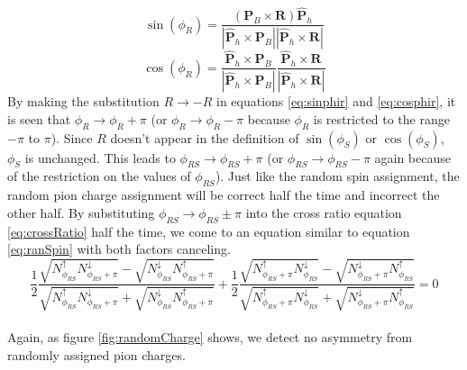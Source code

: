 \documentclass[abstract = on,listof=totoc, bibliography=totoc]{scrreprt}
\newcommand{\phirs}{\phi_{RS}}
\begin{document}
\begin{equation}
\label{eq:sinphir}
\sin(\phi_R) = \frac{(\bm{P}_B \times \bm{R})  \bm{\hat{P}}_h}{|\bm{\hat{P}}_h \times \bm{P}_B||\bm{\hat{P}}_h \times \bm{R}|}
\end{equation}
\begin{equation}
\label{eq:cosphir}
\cos(\phi_R) = \frac{\bm{\hat{P}}_h \times \bm{P}_B}{|\bm{\hat{P}}_h \times \bm{P}_B|}  \frac{\bm{\hat{P}}_h\times \bm{R}}{|\bm{\hat{P}}_h\times \bm{R}|}
\end{equation}
%
By making the substitution $R\rightarrow -R$ in equations \ref{eq:sinphir} and \ref{eq:cosphir}, it is seen that $\phi_R \rightarrow \phi_R + \pi$ (or $\phi_R \rightarrow \phi_R - \pi$ because $\phi_R$ is restricted to the range $-\pi$ to  $\pi$). Since $R$ doesn't appear in the definition of $\sin(\phi_S)$ or $\cos(\phi_S)$, $\phi_S$ is unchanged. This leads to $\phirs \rightarrow \phirs + \pi$ (or $\phirs \rightarrow \phirs - \pi$ again because of the restriction on the values of $\phirs$). Just like the random spin assignment, the random pion charge assignment will be correct half the time and incorrect the other half. By substituting $\phirs \rightarrow \phirs \pm \pi$ into the cross ratio equation \ref{eq:crossRatio} half the time, we come to an equation similar to equation \ref{eq:ranSpin} with both factors canceling.
\begin{equation}
\label{eq:ranCharge}
\frac{1}{2}\frac{\sqrt{N^\uparrow_{\phi_{RS}}N^\downarrow_{\phi_{RS}+\pi}} - \sqrt{N^\downarrow_{\phi_{RS}}N^\uparrow_{\phi_{RS}+\pi}}}{\sqrt{N^\uparrow_{\phi_{RS}}N^\downarrow_{\phi_{RS}+\pi}} + \sqrt{N^\downarrow_{\phi_{RS}}N^\uparrow_{\phi_{RS}+\pi}}}
+
\frac{1}{2}\frac{\sqrt{N^\uparrow_{\phi_{RS}+\pi}N^\downarrow_{\phi_{RS}}} - \sqrt{N^\downarrow_{\phi_{RS}+\pi}N^\uparrow_{\phi_{RS}}}}{\sqrt{N^\uparrow_{\phi_{RS}+\pi}N^\downarrow_{\phi_{RS}}} + \sqrt{N^\downarrow_{\phi_{RS}+\pi}N^\uparrow_{\phi_{RS}}}} = 0
\end{equation}\\
Again, as figure \ref{fig:randomCharge} shows, we detect no asymmetry from randomly assigned pion charges.

\end{document}
